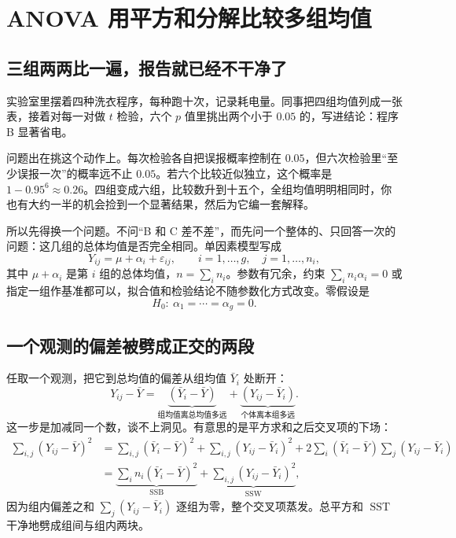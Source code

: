 \section{ANOVA 用平方和分解比较多组均值}
\label{sec:11-Mathematical-Statistics/08-Regression-and-ANOVA/02}

\subsection{三组两两比一遍，报告就已经不干净了}

实验室里摆着四种洗衣程序，每种跑十次，记录耗电量。同事把四组均值列成一张表，接着对每一对做 \(t\) 检验，六个 \(p\) 值里挑出两个小于 \(0.05\) 的，写进结论：程序 B 显著省电。

问题出在挑这个动作上。每次检验各自把误报概率控制在 \(0.05\)，但六次检验里``至少误报一次''的概率远不止 \(0.05\)。若六个比较近似独立，这个概率是 \(1 - 0.95^6 \approx 0.26\)。四组变成六组，比较数升到十五个，全组均值明明相同时，你也有大约一半的机会捡到一个显著结果，然后为它编一套解释。

所以先得换一个问题。不问``B 和 C 差不差''，而先问一个整体的、只回答一次的问题：这几组的总体均值是否完全相同。单因素模型写成
\[
Y_{ij} = \mu + \alpha_i + \varepsilon_{ij},\qquad i = 1,\ldots,g,\quad j = 1,\ldots,n_i,
\]
其中 \(\mu + \alpha_i\) 是第 \(i\) 组的总体均值，\(n = \sum_i n_i\)。参数有冗余，约束 \(\sum_i n_i \alpha_i = 0\) 或指定一组作基准都可以，拟合值和检验结论不随参数化方式改变。零假设是
\[
H_0:\ \alpha_1 = \cdots = \alpha_g = 0 .
\]

\subsection{一个观测的偏差被劈成正交的两段}

任取一个观测，把它到总均值的偏差从组均值 \(\bar Y_i\) 处断开：
\[
Y_{ij} - \bar Y = \underbrace{(\bar Y_i - \bar Y)}_{\text{组均值离总均值多远}} + \underbrace{(Y_{ij} - \bar Y_i)}_{\text{个体离本组多远}} .
\]
这一步是加减同一个数，谈不上洞见。有意思的是平方求和之后交叉项的下场：
\[
\begin{aligned}
\sum_{i,j}(Y_{ij}-\bar Y)^2
&= \sum_{i,j}(\bar Y_i - \bar Y)^2 + \sum_{i,j}(Y_{ij}-\bar Y_i)^2
 + 2\sum_i (\bar Y_i - \bar Y)\sum_j (Y_{ij}-\bar Y_i) \\
&= \underbrace{\sum_i n_i(\bar Y_i - \bar Y)^2}_{\operatorname{SSB}}
 + \underbrace{\sum_{i,j}(Y_{ij}-\bar Y_i)^2}_{\operatorname{SSW}} ,
\end{aligned}
\]
因为组内偏差之和 \(\sum_j (Y_{ij} - \bar Y_i)\) 逐组为零，整个交叉项蒸发。总平方和 \(\operatorname{SST}\) 干净地劈成组间与组内两块。

